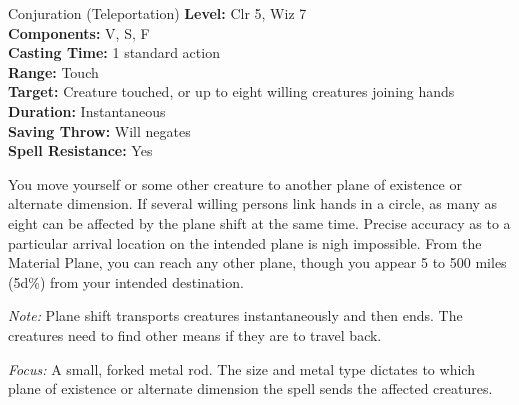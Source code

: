 {Conjuration (Teleportation)}
{
	\textbf{Level:}
	Clr 5, Wiz 7\\
	\textbf{Components:}
	V, S, F\\
	\textbf{Casting Time:}
	1 standard action\\
	\textbf{Range:}
	Touch\\
	\textbf{Target:}
	Creature touched, or up to eight willing creatures joining hands\\
	\textbf{Duration:}
	Instantaneous\\
	\textbf{Saving Throw:}
	Will negates\\
	\textbf{Spell Resistance:}
	Yes\\
}
{
	You move yourself or some other creature to another plane of existence or alternate dimension. If several willing persons link hands in a circle, as many as eight can be affected by the plane shift at the same time. Precise accuracy as to a particular arrival location on the intended plane is nigh impossible. From the Material Plane, you can reach any other plane, though you appear 5 to 500 miles (5d\%) from your intended destination.

	\textit{Note:} Plane shift transports creatures instantaneously and then ends. The creatures need to find other means if they are to travel back.

	\textit{Focus:}
	A small, forked metal rod. The size and metal type dictates to which plane of existence or alternate dimension the spell sends the affected creatures.

}
